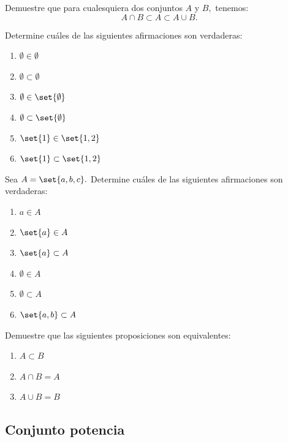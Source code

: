 \begin{problema}
	\label{thm:1.3}
	Demuestre que para cualesquiera dos conjuntos $A$ y $B,$ tenemos:
	$$
	A \cap B \subset A \subset A \cup B.
	$$
\end{problema}

\begin{problema}
	Determine cuáles de las siguientes afirmaciones son verdaderas:
	\begin{enumerate}
		\item $\emptyset \in \emptyset$
		\item $\emptyset \subset \emptyset$
		\item $\emptyset \in \set{\emptyset}$
		\item $\emptyset \subset \set{\emptyset}$
		\item $\set{1} \in \set{1,2}$
		\item $\set{1} \subset \set{1,2}$
	\end{enumerate}
\end{problema}

\begin{problema}
	Sea $A = \set{a, b, c}.$ Determine cuáles de las siguientes afirmaciones son verdaderas:
	\begin{enumerate}
		\item $a \in A$
		\item $\set{a} \in A$
		\item $\set{a} \subset A$
		\item $\emptyset \in A$
		\item $\emptyset \subset A$
		\item $\set{a,b} \subset A$
	\end{enumerate}
\end{problema}

\begin{problema}
	\label{thm:1.4}
	Demuestre que las siguientes proposiciones son equivalentes:
	\begin{enumerate}
		\item $\displaystyle A \subset B$
		\item $\displaystyle A \cap B = A$
		\item $\displaystyle A \cup B = B$
	\end{enumerate}
\end{problema}

\subsection*{Conjunto potencia}

